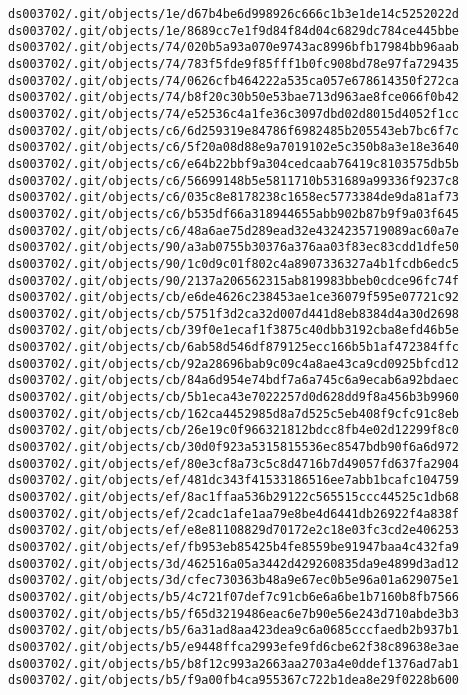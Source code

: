 \documentclass[11pt]{article}
\begin{document}
\begin{Verbatim}[commandchars=\\\{\}]
ds003702/.git/objects/1e/d67b4be6d998926c666c1b3e1de14c5252022d
ds003702/.git/objects/1e/8689cc7e1f9d84f84d04c6829dc784ce445bbe
ds003702/.git/objects/74/020b5a93a070e9743ac8996bfb17984bb96aab
ds003702/.git/objects/74/783f5fde9f85fff1b0fc908bd78e97fa729435
ds003702/.git/objects/74/0626cfb464222a535ca057e678614350f272ca
ds003702/.git/objects/74/b8f20c30b50e53bae713d963ae8fce066f0b42
ds003702/.git/objects/74/e52536c4a1fe36c3097dbd02d8015d4052f1cc
ds003702/.git/objects/c6/6d259319e84786f6982485b205543eb7bc6f7c
ds003702/.git/objects/c6/5f20a08d88e9a7019102e5c350b8a3e18e3640
ds003702/.git/objects/c6/e64b22bbf9a304cedcaab76419c8103575db5b
ds003702/.git/objects/c6/56699148b5e5811710b531689a99336f9237c8
ds003702/.git/objects/c6/035c8e8178238c1658ec5773384de9da81af73
ds003702/.git/objects/c6/b535df66a318944655abb902b87b9f9a03f645
ds003702/.git/objects/c6/48a6ae75d289ead32e4324235719089ac60a7e
ds003702/.git/objects/90/a3ab0755b30376a376aa03f83ec83cdd1dfe50
ds003702/.git/objects/90/1c0d9c01f802c4a8907336327a4b1fcdb6edc5
ds003702/.git/objects/90/2137a206562315ab819983bbeb0cdce96fc74f
ds003702/.git/objects/cb/e6de4626c238453ae1ce36079f595e07721c92
ds003702/.git/objects/cb/5751f3d2ca32d007d441d8eb8384d4a30d2698
ds003702/.git/objects/cb/39f0e1ecaf1f3875c40dbb3192cba8efd46b5e
ds003702/.git/objects/cb/6ab58d546df879125ecc166b5b1af472384ffc
ds003702/.git/objects/cb/92a28696bab9c09c4a8ae43ca9cd0925bfcd12
ds003702/.git/objects/cb/84a6d954e74bdf7a6a745c6a9ecab6a92bdaec
ds003702/.git/objects/cb/5b1eca43e7022257d0d628dd9f8a456b3b9960
ds003702/.git/objects/cb/162ca4452985d8a7d525c5eb408f9cfc91c8eb
ds003702/.git/objects/cb/26e19c0f966321812bdcc8fb4e02d12299f8c0
ds003702/.git/objects/cb/30d0f923a5315815536ec8547bdb90f6a6d972
ds003702/.git/objects/ef/80e3cf8a73c5c8d4716b7d49057fd637fa2904
ds003702/.git/objects/ef/481dc343f41533186516ee7abb1bcafc104759
ds003702/.git/objects/ef/8ac1ffaa536b29122c565515ccc44525c1db68
ds003702/.git/objects/ef/2cadc1afe1aa79e8be4d6441db26922f4a838f
ds003702/.git/objects/ef/e8e81108829d70172e2c18e03fc3cd2e406253
ds003702/.git/objects/ef/fb953eb85425b4fe8559be91947baa4c432fa9
ds003702/.git/objects/3d/462516a05a3442d429260835da9e4899d3ad12
ds003702/.git/objects/3d/cfec730363b48a9e67ec0b5e96a01a629075e1
ds003702/.git/objects/b5/4c721f07def7c91cb6e6a6be1b7160b8fb7566
ds003702/.git/objects/b5/f65d3219486eac6e7b90e56e243d710abde3b3
ds003702/.git/objects/b5/6a31ad8aa423dea9c6a0685cccfaedb2b937b1
ds003702/.git/objects/b5/e9448ffca2993efe9fd6cbe62f38c89638e3ae
ds003702/.git/objects/b5/b8f12c993a2663aa2703a4e0ddef1376ad7ab1
ds003702/.git/objects/b5/f9a00fb4ca955367c722b1dea8e29f0228b600

\end{Verbatim}
\end{document}
